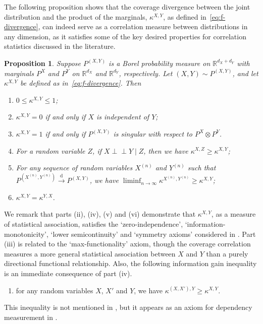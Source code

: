 \documentclass[11pt]{article}
\newtheorem{prop}[thm]{Proposition}
\newcommand{\indep}{\perp\!\!\!\perp}
\newcommand{\dto}{\xrightarrow{\,\mathrm{d}\,} }
\begin{document}
The following proposition shows that the coverage divergence between the joint distribution and the product of the marginals, $\kappa^{X,Y}$, as defined in~\eqref{eq:f-divergence}, can indeed serve as a correlation measure between distributions in any dimension, as it satisfies some of the key desired properties for correlation statistics discussed in the literature. 

\begin{prop}\label{Prop:KappaProperty}
Suppose ${P}^{(X, Y)}$ is a Borel probability measure on $\mathbb{R}^{d_X + d_Y}$ with marginals $P^X$ and $P^Y$ on $\mathbb{R}^{d_X}$ and $\mathbb{R}^{d_Y}$, respectively. Let $(X, Y) \sim P^{(X, Y)}$, and let $\kappa^{X, Y}$ be defined as in~\eqref{eq:f-divergence}. Then
    \begin{enumerate}[label = (\roman*), noitemsep]
        \item $0 \leq \kappa^{X, Y} \leq 1$; 
        \item $\kappa^{X, Y} = 0$ if and only if $X$ is independent of $Y$; 
        \item $\kappa^{X,Y} = 1$ if and only if $P^{(X,Y)}$ is singular with respect to $P^{X}\otimes P^{Y}$.
        \item For a random variable $Z$, if $X \indep Y \mid Z$, then we have $\kappa^{X, Z} \geq \kappa^{X, Y}$;
        \item For any sequence of random variables $X^{(n)}$ and $Y^{(n)}$ such that $P^{(X^{(n)}, Y^{(n)})} \dto P^{(X, Y)}$, we have $\liminf_{n \to \infty} \kappa^{X^{(n)}, Y^{(n)}} \geq \kappa^{X, Y}$;
        \item $\kappa^{X, Y} = \kappa^{Y, X}$. 
    \end{enumerate}
\end{prop}
We remark that parts (ii), (iv), (v) and (vi) demonstrate that $\kappa^{X, Y}$, as a measure of statistical association, satisfies the `zero-independence', `information-monotonicity', `lower semicontinuity' and `symmetry axioms' considered in \citet{borgonovo2025convexity} \citep[see also][]{mori2019four, renyi1959measures}. Part (iii) is related to the `max-functionality' axiom, though the coverage correlation measures a more general statistical association between $X$ and $Y$ than a purely directional functional relationship. Also, the following information gain inequality is an immediate consequence of part (iv).
\begin{enumerate}
    \item[(iv')] for any random variables $X$, $X'$ and $Y$, we have $\kappa^{(X, X'), Y} \geq \kappa^{X, Y}$.
\end{enumerate}
This inequality is not mentioned in \citet{borgonovo2025convexity}, but it appears as an axiom for dependency measurement in \citet{griessenberger2022multivariate}. 
\end{document}
